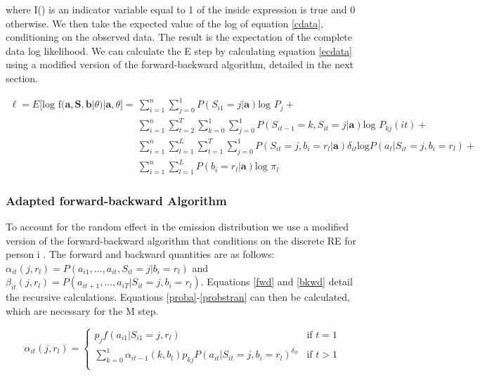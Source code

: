 \documentclass{article}
\begin{document}
where I() is an indicator variable equal to 1 of the inside expression is true and 0 otherwise. We then take the expected value of the log of equation \ref{cdata}, conditioning on the observed data. The result is the expectation of the complete data log likelihood. We can calculate the E step by calculating equation \ref{ecdata} using a modified version of the forward-backward algorithm, detailed in the next section.

\begin{equation}\label{ecdata}
\begin{split}
    \ell = E\big[\text{log f}(\textbf{a},\textbf{S}, \textbf{b} | \theta) | \textbf{a},\theta\big]  = 
        & \sum_{i=1}^n\sum_{j=0}^1P(S_{i1}=j|\textbf{a})\text{log }P_j + \\
    & \sum_{i=1}^n \sum^T_{t=2} \sum_{k=0}^1 \sum_{j=0}^1 
        P(S_{it-1}=k,S_{it}=j|\textbf{a})\text{log }P_{kj}(it) + \\ 
    & \sum_{i=1}^n \sum_{l=1}^L \sum^T_{t=1}\sum_{j=0}^1 
        P(S_{it}=j,b_i=r_l|\textbf{a}) \delta_{it}\text{log}P(a_{t}|S_{it}=j, b_i=r_l) + \\
    &  \sum_{i=1}^n \sum_{l=1}^L P(b_i=r_l|\textbf{a}) \text{log }\pi_l 
\end{split}
\end{equation}

\subsubsection{Adapted forward-backward Algorithm}
To account for the random effect in the emission distribution we use a modified version of the forward-backward algorithm that conditions on the discrete RE for person i \cite{Maruotti2011}. The forward and backward quantities are as follows: $\alpha_{it}(j,r_l) = P(a_{i1}, ..., a_{it}, S_{it} = j | b_i=r_l)$ and $\beta_{it}(j,r_l) =  P(a_{it+1}, ..., a_{iT} | S_{it} = j,b_i=r_l)$. Equations \ref{fwd} and \ref{bkwd} detail the recursive calculations. Equations \ref{proba}-\ref{probstran} can then be calculated, which are necessary for the M step.  
 
\begin{equation} \label{fwd}
\alpha_{it}(j,r_l) = \begin{cases}
    p_{j} f(a_{i1}|S_{i1}=j,r_l) & \text{if } t = 1 \\
    \sum_{k=0}^1 \alpha_{it-1} (k,b_l)p_{kj}P(a_{it}|S_{it}=j,b_i=r_l)^{\delta_{it}} 
        & \text{if } t > 1\\
\end{cases}
\end{equation}
\end{document}
